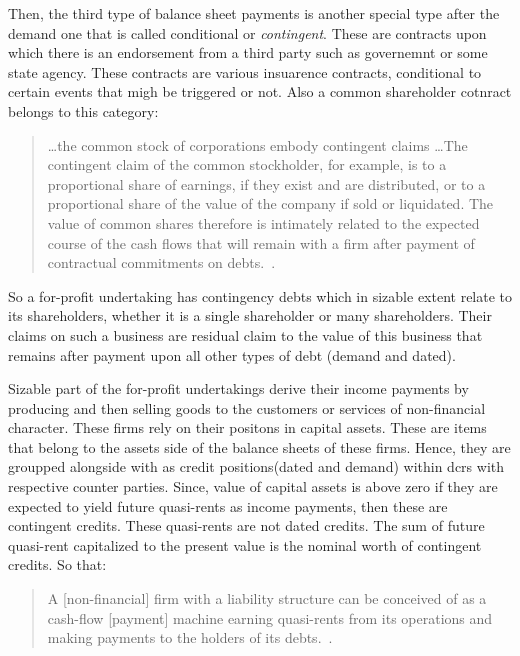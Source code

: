 Then, the third type of balance sheet payments is another special type after the demand one that is called conditional or \textit{contingent}. These are contracts upon which there is an endorsement from a third party such as governemnt or some state agency. These contracts are various insuarence contracts, conditional to certain events that migh be triggered or not. Also a common shareholder cotnract belongs to this category:

\begin{quote}
\dots the common stock of corporations embody contingent claims \dots The contingent claim of the common stockholder, for example, is to a proportional share of earnings, if they exist and are distributed, or to a proportional share of the value of the company if sold or liquidated. The value of common shares therefore is intimately related to the expected course of the cash flows that will remain with a firm after payment of contractual commitments on debts.~\citep[p.~226, emphasis added]{minsky1986}.
\end{quote}

So a for-profit undertaking has contingency debts which in sizable extent relate to its shareholders, whether it is a single shareholder or many shareholders. Their claims on such a business are residual claim to the value of this business that remains after payment upon all other types of debt (demand and dated).

Sizable part of the for-profit undertakings derive their income payments by producing and then selling goods to the customers or services of non-financial character. These firms rely on their positons in capital assets. These are items that belong to the assets side of the balance sheets of these firms. Hence, they are groupped alongside with as credit positions(dated and demand) within \acfp{dcr} with respective counter parties. Since, value of capital assets is above zero if they are expected to yield future quasi-rents as income payments, then these are contingent credits. These quasi-rents are not dated credits. The sum of future quasi-rent capitalized to the present value is the nominal worth of contingent credits. So that:

\begin{quote}
A [non-financial] firm with a liability structure can be conceived of as a cash-flow [payment] machine earning quasi-rents from its operations and making payments to the holders of its debts.~\citep[p.~228]{minsky1986}.
\end{quote}

